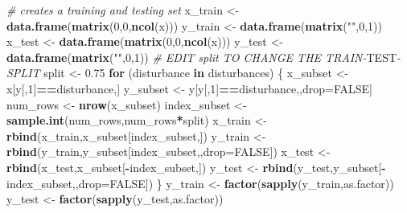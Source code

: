 \documentclass[
]{article}
\newenvironment{Shaded}{\begin{snugshade}}{\end{snugshade}}
\newcommand{\AlertTok}[1]{\textcolor[rgb]{0.94,0.16,0.16}{#1}}
\newcommand{\AttributeTok}[1]{\textcolor[rgb]{0.13,0.29,0.53}{#1}}
\newcommand{\CommentTok}[1]{\textcolor[rgb]{0.56,0.35,0.01}{\textit{#1}}}
\newcommand{\ConstantTok}[1]{\textcolor[rgb]{0.56,0.35,0.01}{#1}}
\newcommand{\ControlFlowTok}[1]{\textcolor[rgb]{0.13,0.29,0.53}{\textbf{#1}}}
\newcommand{\DecValTok}[1]{\textcolor[rgb]{0.00,0.00,0.81}{#1}}
\newcommand{\FloatTok}[1]{\textcolor[rgb]{0.00,0.00,0.81}{#1}}
\newcommand{\FunctionTok}[1]{\textcolor[rgb]{0.13,0.29,0.53}{\textbf{#1}}}
\newcommand{\NormalTok}[1]{#1}
\newcommand{\OtherTok}[1]{\textcolor[rgb]{0.56,0.35,0.01}{#1}}
\newcommand{\SpecialCharTok}[1]{\textcolor[rgb]{0.81,0.36,0.00}{\textbf{#1}}}
\newcommand{\StringTok}[1]{\textcolor[rgb]{0.31,0.60,0.02}{#1}}
\begin{document}
\begin{Shaded}
\begin{Highlighting}[]
\CommentTok{\# creates a training and testing set}
\NormalTok{x\_train }\OtherTok{\textless{}{-}} \FunctionTok{data.frame}\NormalTok{(}\FunctionTok{matrix}\NormalTok{(}\DecValTok{0}\NormalTok{,}\DecValTok{0}\NormalTok{,}\FunctionTok{ncol}\NormalTok{(x)))}
\NormalTok{y\_train }\OtherTok{\textless{}{-}} \FunctionTok{data.frame}\NormalTok{(}\FunctionTok{matrix}\NormalTok{(}\StringTok{""}\NormalTok{,}\DecValTok{0}\NormalTok{,}\DecValTok{1}\NormalTok{))}
\NormalTok{x\_test }\OtherTok{\textless{}{-}} \FunctionTok{data.frame}\NormalTok{(}\FunctionTok{matrix}\NormalTok{(}\DecValTok{0}\NormalTok{,}\DecValTok{0}\NormalTok{,}\FunctionTok{ncol}\NormalTok{(x)))}
\NormalTok{y\_test }\OtherTok{\textless{}{-}} \FunctionTok{data.frame}\NormalTok{(}\FunctionTok{matrix}\NormalTok{(}\StringTok{""}\NormalTok{,}\DecValTok{0}\NormalTok{,}\DecValTok{1}\NormalTok{))}
\CommentTok{\# EDIT \textquotesingle{}split\textquotesingle{} TO CHANGE THE TRAIN{-}}\AlertTok{TEST}\CommentTok{{-}SPLIT}
\NormalTok{split }\OtherTok{\textless{}{-}} \FloatTok{0.75}
\ControlFlowTok{for}\NormalTok{ (disturbance }\ControlFlowTok{in}\NormalTok{ disturbances) \{}
\NormalTok{  x\_subset }\OtherTok{\textless{}{-}}\NormalTok{ x[y[,}\DecValTok{1}\NormalTok{]}\SpecialCharTok{==}\NormalTok{disturbance,]}
\NormalTok{  y\_subset }\OtherTok{\textless{}{-}}\NormalTok{ y[y[,}\DecValTok{1}\NormalTok{]}\SpecialCharTok{==}\NormalTok{disturbance,,drop}\OtherTok{=}\ConstantTok{FALSE}\NormalTok{]}
\NormalTok{  num\_rows }\OtherTok{\textless{}{-}} \FunctionTok{nrow}\NormalTok{(x\_subset)}
\NormalTok{  index\_subset }\OtherTok{\textless{}{-}} \FunctionTok{sample.int}\NormalTok{(num\_rows,num\_rows}\SpecialCharTok{*}\NormalTok{split)}
\NormalTok{  x\_train }\OtherTok{\textless{}{-}} \FunctionTok{rbind}\NormalTok{(x\_train,x\_subset[index\_subset,])}
\NormalTok{  y\_train }\OtherTok{\textless{}{-}} \FunctionTok{rbind}\NormalTok{(y\_train,y\_subset[index\_subset,,}\AttributeTok{drop=}\ConstantTok{FALSE}\NormalTok{])}
\NormalTok{  x\_test }\OtherTok{\textless{}{-}} \FunctionTok{rbind}\NormalTok{(x\_test,x\_subset[}\SpecialCharTok{{-}}\NormalTok{index\_subset,])}
\NormalTok{  y\_test }\OtherTok{\textless{}{-}} \FunctionTok{rbind}\NormalTok{(y\_test,y\_subset[}\SpecialCharTok{{-}}\NormalTok{index\_subset,,}\AttributeTok{drop=}\ConstantTok{FALSE}\NormalTok{])}
\NormalTok{\}}
\NormalTok{y\_train }\OtherTok{\textless{}{-}} \FunctionTok{factor}\NormalTok{(}\FunctionTok{sapply}\NormalTok{(y\_train,as.factor))}
\NormalTok{y\_test }\OtherTok{\textless{}{-}} \FunctionTok{factor}\NormalTok{(}\FunctionTok{sapply}\NormalTok{(y\_test,as.factor))}
\end{Highlighting}
\end{Shaded}
\end{document}

